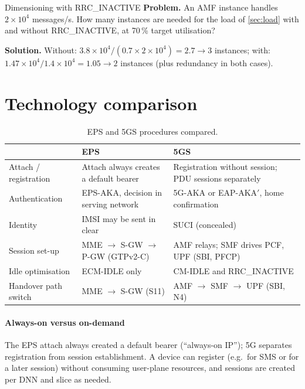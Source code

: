\documentclass[11pt,a4paper]{article}
\begin{document}
\begin{examplebox}{Dimensioning with RRC\_INACTIVE}\label{ex:inactive}
\textbf{Problem.} An AMF instance handles $2\times10^4$ messages/s. How many instances are needed for the load of \cref{sec:load} with and without
RRC\_INACTIVE, at 70\,\% target utilisation?

\textbf{Solution.} Without: $3.8\times10^4/(0.7\times2\times10^4) = 2.7 \to 3$ instances; with: $1.47\times10^4/1.4\times10^4 = 1.05 \to 2$ instances (plus
redundancy in both cases).
\end{examplebox}

\section{Technology comparison}
\begin{table}[htbp]
\centering\small
\caption{EPS and 5GS procedures compared.}\label{tab:cmp}
\begin{tabularx}{\linewidth}{@{}l Y Y@{}}
\toprule
{} & EPS & 5GS \\
\midrule
Attach / registration & Attach always creates a default bearer & Registration without session; PDU sessions separately \\
Authentication        & EPS-AKA, decision in serving network & 5G-AKA or EAP-AKA$'$, home confirmation \\
Identity              & IMSI may be sent in clear          & SUCI (concealed) \\
Session set-up        & MME $\to$ S-GW $\to$ P-GW (GTPv2-C)  & AMF relays; SMF drives PCF, UPF (SBI, PFCP) \\
Idle optimisation     & ECM-IDLE only                      & CM-IDLE and RRC\_INACTIVE \\
Handover path switch  & MME $\to$ S-GW (S11)               & AMF $\to$ SMF $\to$ UPF (SBI, N4) \\
\bottomrule
\end{tabularx}
\end{table}

\paragraph{Always-on versus on-demand} The EPS attach always created a default bearer (``always-on IP''); 5G separates registration from
session establishment. A device can register (e.g.\ for SMS or for a later session) without consuming user-plane resources, and sessions are
created per DNN and slice as needed.
\end{document}
